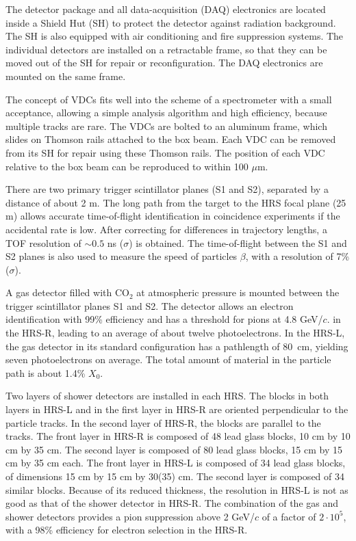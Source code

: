 The detector package and all data-acquisition (DAQ) electronics are located 
inside a Shield Hut (SH) to protect the detector against radiation background.
The SH is also equipped with air conditioning and fire
suppression systems. The individual detectors are installed on a 
retractable frame, so that they can be moved out of the SH 
for repair or reconfiguration. 
The DAQ electronics are mounted on the same frame.

The concept of VDCs fits well into the scheme of a spectrometer with a small 
acceptance, allowing a simple analysis algorithm and high efficiency, 
because multiple tracks are rare.
The VDCs are bolted to an aluminum frame, which slides on Thomson rails 
attached to the box beam. 
Each VDC can be removed from its SH for repair using these Thomson rails. 
The position of each VDC relative to the box beam can be reproduced to within 
100 $\mu$m. 

There are two primary trigger scintillator planes (S1 and S2), 
separated by a distance of about 2 m. 
The long path from the target to the HRS focal plane (25 m) allows 
accurate time-of-flight identification in coincidence experiments 
if the accidental rate is low. 
After correcting for differences in trajectory lengths, 
a TOF resolution of $\sim 0.5$ ns ($\sigma$) is obtained. 
The time-of-flight between the S1 and S2 planes is also used to measure 
the speed of particles $\beta$, with a resolution of 7\% ($\sigma$).

A gas \Cherenkov{} detector filled  with CO$_{2}$ at atmospheric 
pressure is mounted between the trigger scintillator planes S1 and S2. 
The detector allows an electron identification  with 99\% efficiency
and has a threshold for pions at 4.8 GeV/$c$. 
\Cherenkov{} in the HRS-R, leading to an average of about twelve photoelectrons. 
In the HRS-L, the gas \Cherenkov{} detector in its standard configuration has 
a pathlength of 80~cm, yielding seven photoelectrons on average. 
The total amount of material in the particle path is about 1.4\% $X_0$. 

Two layers of shower detectors are installed in each HRS. 
The blocks in both layers in HRS-L and in the first 
layer in HRS-R are oriented perpendicular to the particle tracks. 
In the second layer of HRS-R, the blocks are parallel to the tracks. 
The front layer in HRS-R is composed of 48 lead glass blocks, 
10 cm by 10 cm by 35 cm. 
The second layer is composed of 80 lead glass blocks, 
15 cm by 15 cm by 35 cm each.  
The front layer in HRS-L is composed of 34 lead glass blocks, of 
dimensions 15 cm by 15 cm by 30(35) cm. 
The second layer is  composed of 34 similar blocks. 
Because of its reduced thickness, the resolution in HRS-L is not as good 
as that of the shower detector in HRS-R.
The combination of the gas \Cherenkov{} and shower detectors provides a 
pion suppression above 2 GeV/$c$ of  a factor of $2 \cdot 10^{5}$, with a 
98\% efficiency for electron selection in the HRS-R. 

